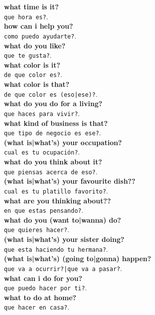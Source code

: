 \documentclass[twocolumn]{article}
\begin{document}
  \textbf{what time is it?}\\\texttt{que hora es?}.\\
  \textbf{how can i help you?}\\\texttt{como puedo ayudarte?}.\\
  \textbf{what do you like?}\\\texttt{que te gusta?}.\\
  \textbf{what color is it?}\\\texttt{de que color es?}.\\
  \textbf{what color is that?}\\\texttt{de que color es (eso|ese)?}.\\
  \textbf{what do you do for a living?}\\\texttt{que haces para vivir?}.\\
  \textbf{what kind of business is that?}\\\texttt{que tipo de negocio es ese?}.\\
  \textbf{(what is|what's) your occupation?}\\\texttt{cual es tu ocupaci\'on?}.\\
  \textbf{what do you think about it?}\\\texttt{que piensas acerca de eso?}.\\
  \textbf{(what is|what's) your favourite dish??}\\\texttt{cual es tu platillo favorito?}.\\
  \textbf{what are you thinking about??}\\\texttt{en que estas pensando?}.\\
  \textbf{what do you (want to|wanna) do?}\\\texttt{que quieres hacer?}.\\
  \textbf{(what is|what's) your sister doing?}\\\texttt{que esta haciendo tu hermana?}.\\
  \textbf{(what is|what's) (going to|gonna) happen?}\\\texttt{que va a ocurrir?|que va a pasar?}.\\
  \textbf{what can i do for you?}\\\texttt{que puedo hacer por ti?}.\\
  \textbf{what to do at home?}\\\texttt{que hacer en casa?}.\\
\end{document}
